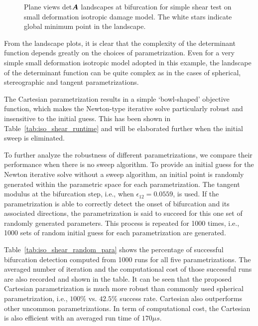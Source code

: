 \documentclass[12pt]{article}
\numberwithin{equation}{section}
\begin{document}
\begin{figure}[H]
{ } 
   \caption{Plane views det${\boldsymbol{A}}$ landscapes at bifurcation
   for simple shear test on small deformation isotropic damage model. 
   The white stars indicate global minimum point in the landscape.}
   \label{fig:iso_shear_detAXplane}
 \end{figure}

From the landscape plots, it is clear that the complexity of the 
determinant function depends greatly on the choices of 
parametrization. Even for a very simple small deformation isotropic 
model adopted in this example, the landscape of the determinant 
function can be quite complex as in the cases of spherical, 
stereographic and tangent parametrizations. 

The Cartesian parametrization results in a simple `bowl-shaped' 
objective function, which makes the Newton-type iterative solve 
particularly robust and insensitive to the initial guess. This has 
been shown in Table~\ref{tab:iso_shear_runtime} and will be 
elaborated further when the initial sweep is eliminated. 

To further analyze the robustness of different parametrizations, we 
compare their performance when there is no sweep algorithm. To provide 
an initial guess for the Newton iterative solve without a sweep 
algorithm, an initial point is randomly generated within the 
parametric space for each parametrization. The tangent modulus at the 
bifurcation step, i.e., when $\epsilon_{12}=0.0559$, is used. If the 
parametrization is able to correctly detect the onset of bifurcation 
and its associated directions, the parametrization is said to succeed 
for this one set of randomly generated parameters. This process is 
repeated for 1000 times, i.e., 1000 sets of random initial guess for 
each parametrization are generated.

Table~\ref{tab:iso_shear_random_para} shows the percentage of 
successful bifurcation detection computed from 1000 runs for all five 
parametrizations. The averaged number of iteration and the 
computational cost of those successful runs are also recorded and 
shown in the table. It can be seen that the proposed Cartesian 
parametrization is much more robust than commonly used spherical 
parametrization, i.e., $100\%$ vs. $42.5\%$ success rate. Cartesian 
also outperforms other uncommon parametrizations. In term of 
computational cost, the Cartesian is also efficient with an averaged 
run time of $170\mu s$.
\end{document}
